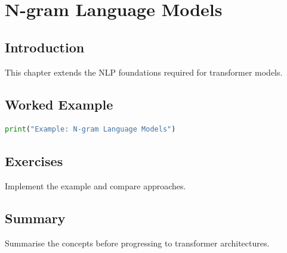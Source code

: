 \chapter{N-gram Language Models}
\label{chap:vol8-6}



\section{Introduction}
This chapter extends the NLP foundations required for transformer models.

\section{Worked Example}
\begin{lstlisting}[language=Python]
print("Example: N-gram Language Models")
\end{lstlisting}

\section{Exercises}
\begin{exercise}
Implement the example and compare approaches.
\end{exercise}

\section{Summary}
Summarise the concepts before progressing to transformer architectures.
